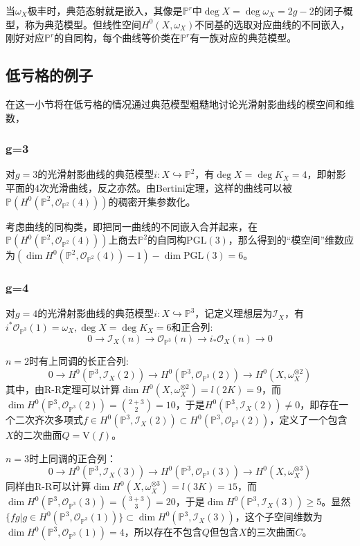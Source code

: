 当$ \omega_X $极丰时，典范态射就是嵌入，其像是$ \mathbb{P}^r $中$ \deg X=\deg \omega_X=2g-2 $的闭子概型，称为典范模型。但线性空间$ H^0(X,\omega_X) $不同基的选取对应曲线的不同嵌入，刚好对应$ \mathbb{P}^r $的自同构，每个曲线等价类在$ \mathbb{P}^r $有一族对应的典范模型。
\subsection{低亏格的例子}
在这一小节将在低亏格的情况通过典范模型粗糙地讨论光滑射影曲线的模空间和维数，
\subsubsection{ g=3 }
对$ g=3 $的光滑射影曲线的典范模型$ i:X\hookrightarrow\mathbb{P}^2 $，有$ \deg X=\deg K_X=4 $，即射影平面的4次光滑曲线，反之亦然。由Bertini定理，这样的曲线可以被$ \mathbb{P}\left (H^0\left (\mathbb{P}^2,\mathscr{O}_{\mathbb{P}^2}\left (4\right )\right )\right ) $的稠密开集参数化。

考虑曲线的同构类，即把同一曲线的不同嵌入合并起来，在$ \mathbb{P}(H^0(\mathbb{P}^2,\mathscr{O}_{\mathbb{P}^2}(4))) $上商去$ \mathbb{P}^2 $的自同构$ \mathrm{PGL}(3) $，那么得到的“模空间”维数应为$ (\dim H^0(\mathbb{P}^2,\mathscr{O}_{\mathbb{P}^2}(4))-1)-\dim \mathrm{PGL}(3)=6 $。

\subsubsection{ g=4 }
对$ g=4 $的光滑射影曲线的典范模型$ i:X\hookrightarrow\mathbb{P}^3 $，记定义理想层为$ \mathscr{I}_X $，有$ i^*\mathscr{O}_{\mathbb{P}^3}(1)=\omega_X,\deg X=\deg K_X=6 $和正合列:
$$ 0\to \mathscr{I}_X(n)\to \mathscr{O}_{\mathbb{P}^3}(n) \to i_*\mathscr{O}_X(n)\to 0 $$

$ n=2 $时有上同调的长正合列:
$$0\to H^0(\mathbb{P}^3,\mathscr{I}_X(2)) \to  H^0(\mathbb{P}^3,\mathscr{O}_{\mathbb{P}^3}(2)) \to  H^0(X,\omega_{X}^{\otimes 2}) $$
其中，由R-R定理可以计算$ \dim H^0(X,\omega_{X}^{\otimes 2}) =l(2K)=9 $，而$ \dim H^0(\mathbb{P}^3,\mathscr{O}_{\mathbb{P}^3}(2))=\binom{2+3}{2}=10  $，于是$ H^0(\mathbb{P}^3,\mathscr{I}_X(2))\neq 0 $，即存在一个二次齐次多项式$ f\in H^0(\mathbb{P}^3,\mathscr{I}_X(2)) \subset H^0(\mathbb{P}^3,\mathscr{O}_{\mathbb{P}^3}(2)) $，定义了一个包含$ X $的二次曲面$ Q=\mathrm{V}(f) $。

$ n=3 $时上同调的正合列：
$$0\to H^0(\mathbb{P}^3,\mathscr{I}_X(3)) \to  H^0(\mathbb{P}^3,\mathscr{O}_{\mathbb{P}^3}(3)) \to  H^0(X,\omega_{X}^{\otimes 3}) $$
同样由R-R可以计算$ \dim H^0(X,\omega_{X}^{\otimes 3}) =l(3K)=15 $，而$ \dim H^0(\mathbb{P}^3,\mathscr{O}_{\mathbb{P}^3}(3))=\binom{3+3}{3}=20  $，于是$\dim H^0(\mathbb{P}^3,\mathscr{I}_X(3))\geqslant 5 $。显然$ \{ fg|g\in H^0(\mathbb{P}^3,\mathscr{O}_{\mathbb{P}^3}(1))\}\subset \dim H^0(\mathbb{P}^3,\mathscr{I}_X(3)) $，这个子空间维数为$ \dim H^0(\mathbb{P}^3,\mathscr{O}_{\mathbb{P}^3}(1))=4 $，所以存在不包含$ Q $但包含$ X $的三次曲面$ C $。

